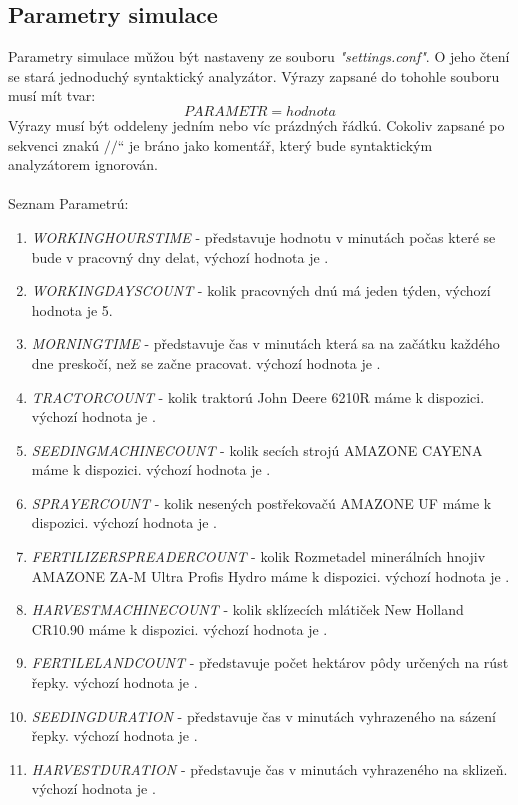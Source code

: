 \documentclass[11pt,a4paper,titlepage]{article}
\newcommand{\ceskeuvozovky}[1]{\quotedblbase#1\textquotedblleft}
\begin{document}
\pagebreak


\subsection{Parametry simulace}
Parametry simulace mǔžou být nastaveny ze souboru \emph{"settings.conf"}. O jeho čtení se stará jednoduchý syntaktický analyzátor. Výrazy zapsané do tohohle souboru musí mít tvar: $$PARAMETR = hodnota$$ Výrazy musí být oddeleny jedním nebo víc prázdných řádkú. Cokoliv zapsané po sekvenci znakú \ceskeuvozovky{$//$} je bráno jako komentář, který bude syntaktickým analyzátorem ignorován.
\\ \\
Seznam Parametrú:
\begin{enumerate}
    \item{\emph{WORKINGHOURSTIME} - představuje hodnotu v minutách počas které se bude v pracovný dny delat, výchozí hodnota je .}
    \item{\emph{WORKINGDAYSCOUNT} - kolik pracovných dnú má jeden týden, výchozí hodnota je 5.}
    \item{\emph{MORNINGTIME} - představuje čas v minutách která sa na začátku každého dne preskočí, než se začne pracovat. výchozí hodnota je .}
    \item{\emph{TRACTORCOUNT} - kolik traktorú John Deere 6210R máme k dispozici. výchozí hodnota je .}
    \item{\emph{SEEDINGMACHINECOUNT} - kolik secích strojú AMAZONE CAYENA máme k dispozici. výchozí hodnota je .}
    \item{\emph{SPRAYERCOUNT} - kolik nesených postřekovačú AMAZONE UF máme k dispozici. výchozí hodnota je .}
    \item{\emph{FERTILIZERSPREADERCOUNT} - kolik Rozmetadel minerálních hnojiv AMAZONE ZA-M Ultra Profis Hydro máme k dispozici. výchozí hodnota je .}
    \item{\emph{HARVESTMACHINECOUNT} - kolik sklízecích mlátiček New Holland CR10.90 máme k dispozici. výchozí hodnota je .}
    \item{\emph{FERTILELANDCOUNT} - představuje počet hektárov pôdy určených na rúst řepky. výchozí hodnota je .}
    \item{\emph{SEEDINGDURATION} - představuje čas v minutách vyhrazeného na sázení řepky. výchozí hodnota je .}
    \item{\emph{HARVESTDURATION} - představuje čas v minutách vyhrazeného na sklizeň. výchozí hodnota je .}
\end{enumerate}
\end{document}
